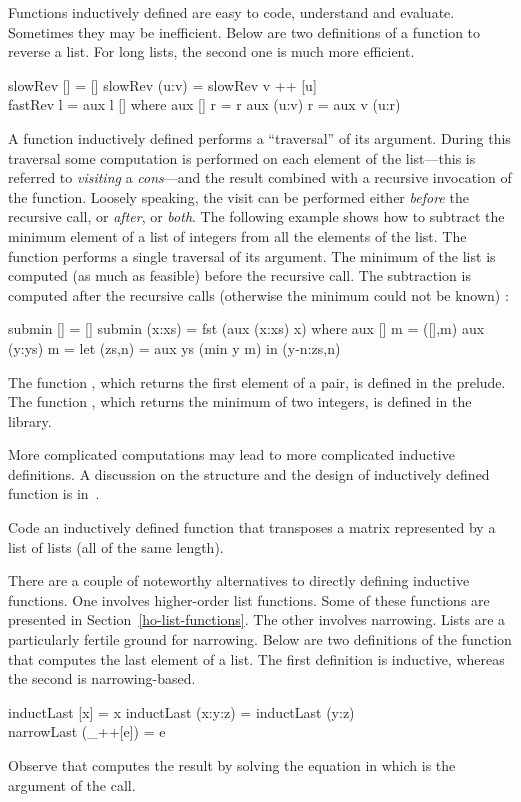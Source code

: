 Functions inductively defined are easy
to code, understand and evaluate.  Sometimes they may be inefficient.
Below are two definitions of a function to reverse a list.
For long lists, the second one is much more efficient.
%
\begin{prog}
slowRev [] = []
slowRev (u:v) = slowRev v ++ [u] \\[-2ex]
fastRev l = aux l []
  where aux [] r = r
        aux (u:v) r = aux v (u:r)
\end{prog}
%
A function inductively defined performs a ``traversal'' of its argument.
During this traversal some computation is performed on each
element of the list---this is referred to \emph{visiting}
a \emph{cons}---and the result combined with a
recursive invocation of the function.
Loosely speaking, the visit
can be performed either \emph{before} the recursive call,
or \emph{after}, or \emph{both}.
The following example shows how to subtract the minimum element of
a list of integers from all the elements of the list.
The function performs a single traversal of its argument.
The minimum of the list is computed (as much as feasible) before
the recursive call.
The subtraction is computed after the recursive
calls (otherwise the minimum could not be known)
:
%
\begin{prog}
submin [] = []
submin (x:xs) = fst (aux (x:xs) x)
  where aux []     m = ([],m)
        aux (y:ys) m = let (zs,n) = aux ys (min y m)
                        in (y-n:zs,n)
\end{prog}
%
The function , which returns the first element of a pair,
is defined in the prelude.
The function , which returns the minimum of two
integers, is defined in the  library.

More complicated computations may lead to more complicated
inductive definitions. A discussion on the structure
and the design of inductively defined function is in~\cite{Antoy92ALP}.
%
\begin{exercise}
Code an inductively defined function that transposes a matrix
represented by a list of lists (all of the same length).
\end{exercise}
%
There are a couple of noteworthy alternatives to directly defining
inductive functions.  One involves higher-order list functions.
Some of these functions are presented in Section~\ref{ho-list-functions}.
The other involves narrowing.
Lists are a particularly fertile ground for narrowing.
Below are two definitions of the function that computes the
last element of a list.  The first definition is inductive,
whereas the second is narrowing-based. 
%
\begin{prog}
inductLast [x] = x
inductLast (x:y:z) = inductLast (y:z) \\[-2ex]
narrowLast (_++[e]) = e
\end{prog}
%
Observe that  computes the result by solving the
equation  in which  is the argument of
the call.
%

